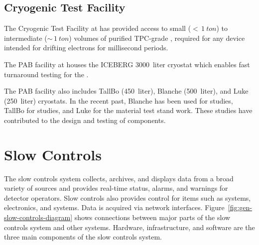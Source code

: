 \subsection{Cryogenic Test Facility}

The Cryogenic Test Facility at \fnal has provided access to small ($<\,\SI{1}{ton}$) to intermediate ($\sim\,\SI{1}{ton}$) volumes of purified TPC-grade , required for %
any device intended for drifting electrons for millisecond periods. %



The PAB facility at \fnal houses the ICEBERG \SI {3000} {liter} cryostat which enables fast turnaround testing for the  . 

The PAB facility also includes TallBo (\SI {450} {liter}), Blanche (\SI {500} {liter}), and Luke (\SI {250} {liter}) cryostats. %
In the recent past, Blanche has been used for  studies, TallBo for  studies, and Luke for the material test stand work. These studies have contributed to the design and testing of   components.



\section{Slow Controls}

The slow controls system collects, archives, and displays data from
a broad variety of sources and provides real-time status, alarms, and warnings for detector operators. Slow controls also provides control for %
items such as  systems,  electronics, and  systems. Data is acquired via network interfaces.  Figure~\ref{fig:gen-slow-controls-diagram} shows connections between major parts of the slow controls system and other systems. Hardware, infrastructure, and software are the three main components of the slow controls system. %

